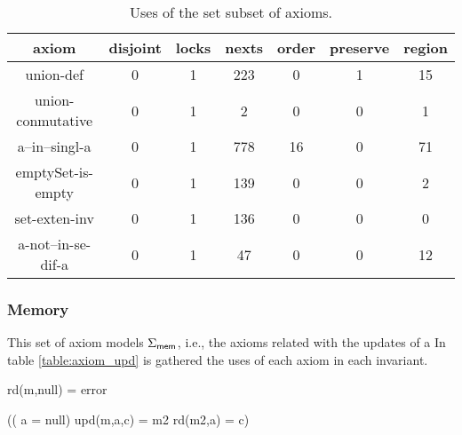 	\begin{table}[hbtp]
		\centering
		\begin{tabular}{c|cccccc}
		axiom & disjoint & locks & nexts & order & preserve & region 
		\\\hline
				union-def & 0 & 1 & 223 & 0 & 1 & 15 
				\\
				union-conmutative & 0 & 1 & 2 & 0 & 0 & 1 
				\\
				a--in--singl-a & 0 & 1 & 778 & 16 & 0 & 71 
				\\
				emptySet-is-empty & 0 & 1 & 139 & 0 & 0 & 2 
				\\
				set-exten-inv & 0 & 1 & 136 & 0 & 0 & 0 
				\\
				a-not--in-se-dif-a & 0 & 1 & 47 & 0 & 0 & 12 
				\\
		\end{tabular}
		\label{table:axiom_set}
		\caption{Uses of the set subset of axioms.}
	\end{table}


\subsubsection{Memory}

	This set of axiom models $\Sigma_{\mathsf{mem}}$, i.e., the axioms related with the updates of a \mem
	In table \ref{table:axiom_upd} is gathered the uses of each axiom in each invariant.

	\begin{axiomdescription}
		\label{ax::rd_mem__def}
		\begin{formula}
			rd(m,null) = error
		\end{formula}
	\end{axiomdescription}

	\begin{axiomdescription}
		\label{ax::upd__def__not_null}
		\begin{formula}
			((\neg\;  a = null) \implies upd(m,a,c) = m2 \implies rd(m2,a) = c)
		\end{formula}
	\end{axiomdescription}

